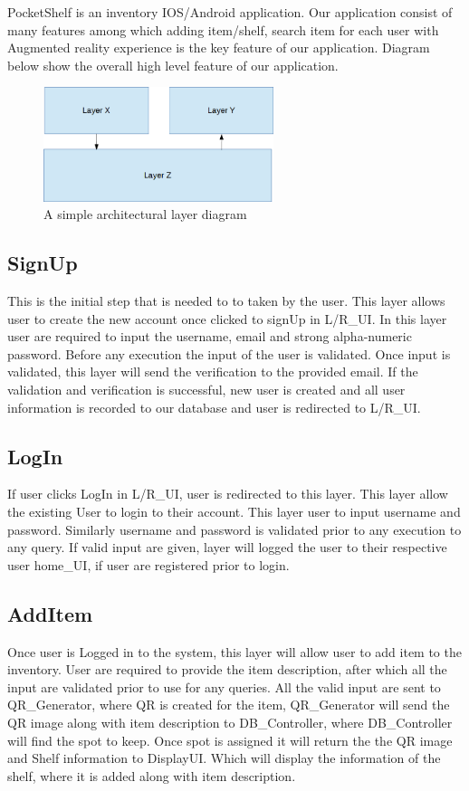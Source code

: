 PocketShelf is an inventory IOS/Android application. Our application consist of many features among which adding item/shelf, search item for each user with Augmented reality experience is the key feature of our application. Diagram below show the overall high level feature of our application.


\begin{figure}[h!]
	\centering
 	\includegraphics[width=0.60\textwidth]{images/layers}
 \caption{A simple architectural layer diagram}
\end{figure}

\subsection{SignUp}
This is the initial step that is needed to to taken by the user. This layer allows user to create the new account once clicked to signUp in L/R\_UI. In this layer user are required to input the username, email and strong alpha-numeric password. Before any execution the input of the user is validated. Once input is validated, this layer will send the verification to the provided email. If the validation and verification is successful, new user is created and all user information is recorded to our database and user is redirected to L/R\_UI.

\subsection{LogIn}
If user clicks LogIn in L/R\_UI, user is redirected to this layer. This layer allow the existing User to login to their account. This layer user to input username and password. Similarly username and password is validated prior to any execution to any query. If valid input are given, layer will logged the user to their respective user home\_UI, if user are registered prior to login.

\subsection{AddItem}
Once user is Logged in to the system, this layer will allow user to add item to the inventory. User are required to provide the item description, after which all the input are validated prior to use for any queries. All the valid input are sent to QR\_Generator, where QR is created for the item, QR\_Generator will send the QR image along with item description to DB\_Controller, where DB\_Controller will find the spot to keep. Once spot is assigned it will return the the QR image and Shelf information to DisplayUI. Which will display the information of the shelf, where it is added along with item description. 